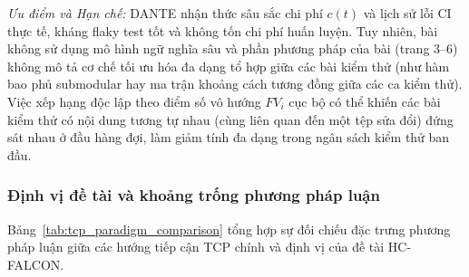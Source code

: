 \textit{Ưu điểm và Hạn chế:} DANTE nhận thức sâu sắc chi phí $c(t)$ và lịch sử lỗi CI thực tế, kháng flaky test tốt và không tốn chi phí huấn luyện. Tuy nhiên, bài không sử dụng mô hình ngữ nghĩa sâu và phần phương pháp của bài (trang 3--6) không mô tả cơ chế tối ưu hóa đa dạng tổ hợp giữa các bài kiểm thử (như hàm bao phủ submodular hay ma trận khoảng cách tương đồng giữa các ca kiểm thử). Việc xếp hạng độc lập theo điểm số vô hướng $FV_i$ cục bộ có thể khiến các bài kiểm thử có nội dung tương tự nhau (cùng liên quan đến một tệp sửa đổi) đứng sát nhau ở đầu hàng đợi, làm giảm tính đa dạng trong ngân sách kiểm thử ban đầu.

\subsubsection{Định vị đề tài và khoảng trống phương pháp luận}
\label{subsubsec:research_positioning}

Bảng~\ref{tab:tcp_paradigm_comparison} tổng hợp sự đối chiếu đặc trưng phương pháp luận giữa các hướng tiếp cận TCP chính và định vị của đề tài HC-FALCON.

